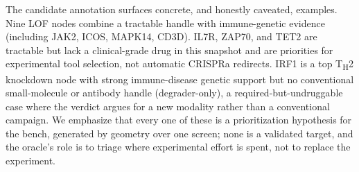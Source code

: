 The candidate annotation surfaces concrete, and honestly caveated, examples. Nine LOF nodes
combine a tractable handle with immune-genetic evidence (including JAK2, ICOS, MAPK14, CD3D).
IL7R, ZAP70, and TET2 are tractable but lack a clinical-grade drug in this snapshot and are
priorities for experimental tool selection, not automatic CRISPRa redirects. IRF1 is a top
T\textsubscript{H}2 knockdown node with strong immune-disease
genetic support but no conventional small-molecule or antibody handle (degrader-only), a
required-but-undruggable case where the verdict argues for a new modality rather than a
conventional campaign. We emphasize that every one of these is a prioritization hypothesis for
the bench, generated by geometry over one screen; none is a validated target, and the oracle's
role is to triage where experimental effort is spent, not to replace the experiment.
